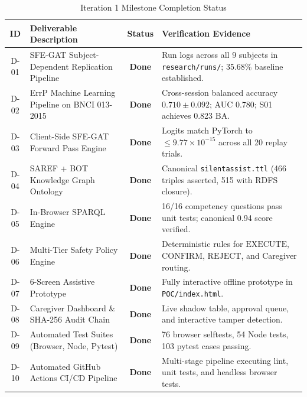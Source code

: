 \documentclass[12pt,a4paper]{report}
\begin{document}
\begin{table}[H]
\centering
\small
\caption{Iteration 1 Milestone Completion Status}
\label{tab:deliverables}
\begin{tabularx}{\textwidth}{c p{5.5cm} c X}
\toprule
\textbf{ID} & \textbf{Deliverable Description} & \textbf{Status} & \textbf{Verification Evidence} \\
\midrule
D-01 & SFE-GAT Subject-Dependent Replication Pipeline & \textbf{Done} & Run logs across all 9 subjects in \texttt{research/runs/}; 35.68\% baseline established. \\
\addlinespace
D-02 & ErrP Machine Learning Pipeline on BNCI 013-2015 & \textbf{Done} & Cross-session balanced accuracy $0.710 \pm 0.092$; AUC 0.780; S01 achieves 0.823 BA. \\
\addlinespace
D-03 & Client-Side SFE-GAT Forward Pass Engine & \textbf{Done} & Logits match PyTorch to $\le 9.77 \times 10^{-15}$ across all 20 replay trials. \\
\addlinespace
D-04 & SAREF + BOT Knowledge Graph Ontology & \textbf{Done} & Canonical \texttt{silentassist.ttl} (466 triples asserted, 515 with RDFS closure). \\
\addlinespace
D-05 & In-Browser SPARQL Engine & \textbf{Done} & 16/16 competency questions pass unit tests; canonical 0.94 score verified. \\
\addlinespace
D-06 & Multi-Tier Safety Policy Engine & \textbf{Done} & Deterministic rules for $\mathrm{EXECUTE}$, $\mathrm{CONFIRM}$, $\mathrm{REJECT}$, and Caregiver routing. \\
\addlinespace
D-07 & 6-Screen Assistive Prototype & \textbf{Done} & Fully interactive offline prototype in \texttt{POC/index.html}. \\
\addlinespace
D-08 & Caregiver Dashboard \& SHA-256 Audit Chain & \textbf{Done} & Live shadow table, approval queue, and interactive tamper detection. \\
\addlinespace
D-09 & Automated Test Suites (Browser, Node, Pytest) & \textbf{Done} & 76 browser selftests, 54 Node tests, 103 pytest cases passing. \\
\addlinespace
D-10 & Automated GitHub Actions CI/CD Pipeline & \textbf{Done} & Multi-stage pipeline executing lint, unit tests, and headless browser tests. \\
\bottomrule
\end{tabularx}
\end{table}
\end{document}
